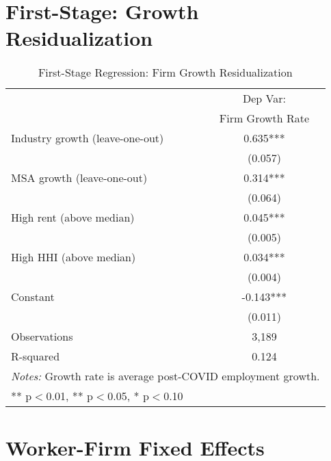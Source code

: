 \documentclass[11pt]{article}
\begin{document}
\section{First-Stage: Growth Residualization}

\begin{table}[H]
\centering
\caption{First-Stage Regression: Firm Growth Residualization}
\begin{tabular}{lc}
\toprule
 & Dep Var: \\
 & Firm Growth Rate \\
\midrule
Industry growth (leave-one-out) & 0.635*** \\
                               & (0.057) \\
MSA growth (leave-one-out)     & 0.314*** \\
                               & (0.064) \\
High rent (above median)       & 0.045*** \\
                               & (0.005) \\
High HHI (above median)        & 0.034*** \\
                               & (0.004) \\
Constant                       & -0.143*** \\
                               & (0.011) \\
\midrule
Observations                   & 3,189 \\
R-squared                      & 0.124 \\
\bottomrule
\multicolumn{2}{l}{\footnotesize \textit{Notes:} Growth rate is average post-COVID employment growth.} \\
\multicolumn{2}{l}{\footnotesize *** p$<$0.01, ** p$<$0.05, * p$<$0.10} \\
\end{tabular}
\end{table}

\section{Worker-Firm Fixed Effects}
\end{document}
